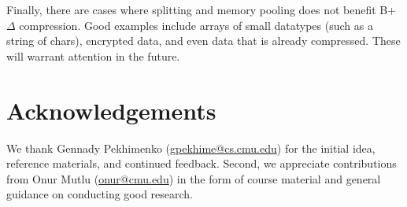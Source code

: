 \documentclass[pageno]{jpaper}
\begin{document}
Finally, there are cases where splitting and memory pooling does not benefit B+$\Delta$ compression. Good examples include arrays of small datatypes (such as a string of chars), encrypted data, and even data that is already compressed. These will warrant attention in the future.


\section{Acknowledgements}
We thank Gennady Pekhimenko (\href{mailto:gpekhime@cs.cmu.edu}{gpekhime@cs.cmu.edu}) for the initial idea, reference materials, and continued feedback. Second, we appreciate contributions from Onur Mutlu (\href{mailto:onur@cmu.edu}{onur@cmu.edu}) in the form of course material and general guidance on conducting good research.




\end{document}
